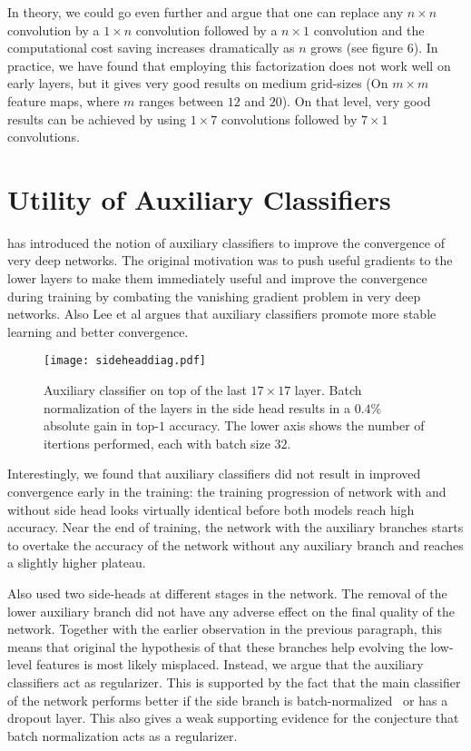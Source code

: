 \documentclass[10pt,twocolumn,letterpaper]{article}
\begin{document}
In theory, we could go even further and argue that one can
replace any $n\times n$ convolution by a $1\times n$ convolution followed
by a $n\times 1$ convolution and the computational cost saving increases
dramatically as $n$ grows (see figure 6). In practice, we have found that employing this
factorization does not work well on early layers, but it gives very good results
on medium grid-sizes (On $m\times m$ feature maps, where $m$ ranges between $12$
and $20$). On that level, very good results can be achieved by using
$1\times 7$ convolutions followed by $7\times 1$ convolutions.
 \section{Utility of Auxiliary Classifiers}

\cite{szegedy2015going} has introduced the notion of auxiliary classifiers
to improve the convergence of very deep networks. The original motivation was
to push useful gradients to the lower layers to make them immediately
useful and improve the convergence during training by combating the
vanishing gradient problem in very deep networks. Also Lee et al\cite{lee2014deeply}
argues that auxiliary classifiers promote more stable learning and better
convergence.
\begin{figure}
\centering
\texttt{[image: sideheaddiag.pdf]}
\caption{Auxiliary classifier on top of the last $17\times 17$ layer.
Batch normalization\cite{ioffe2015batch} of the layers in the side head
results in a $0.4\%$ absolute gain in top-$1$ accuracy. The lower axis shows
the number of itertions performed, each with batch size $32$.}
\label{fig:sidehead}
\end{figure}
Interestingly, we found that auxiliary classifiers did not result in improved
convergence early in the training: the training progression of network with
and without side head looks virtually identical before both models reach
high accuracy. Near the end of training, 
the network with the auxiliary branches starts to
overtake the accuracy of the network without any auxiliary branch and
reaches a slightly higher plateau.

Also \cite{szegedy2015going} used two side-heads at different stages in the
network. The removal of the lower auxiliary branch did not have any
adverse effect on the final quality of the network. Together with the
earlier observation in the previous paragraph, this means that
original the hypothesis of \cite{szegedy2015going} that these branches
help evolving the low-level features is most likely misplaced.
Instead, we argue that the auxiliary classifiers act as regularizer.
This is supported by the fact that the main classifier of the
network  performs better if the side branch is batch-normalized~\cite{ioffe2015batch}
or has a dropout layer. This also gives a weak supporting evidence for the
conjecture that batch normalization acts as a regularizer.
\end{document}
